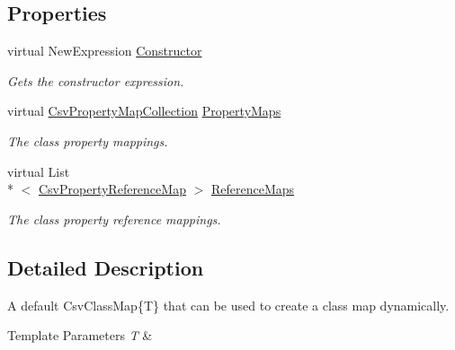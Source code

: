 \subsection*{Properties}
\begin{DoxyCompactItemize}
\item 
virtual New\-Expression \hyperlink{a00040_ae8038b36db7584ef1a73852fcc46404b}{Constructor}
\begin{DoxyCompactList}\small\item\em Gets the constructor expression. \end{DoxyCompactList}\item 
virtual \hyperlink{a00051}{Csv\-Property\-Map\-Collection} \hyperlink{a00040_a9580e897abcba144f3101eb983348e25}{Property\-Maps}
\begin{DoxyCompactList}\small\item\em The class property mappings. \end{DoxyCompactList}\item 
virtual List\\*
$<$ \hyperlink{a00055}{Csv\-Property\-Reference\-Map} $>$ \hyperlink{a00040_a6dfbf8f743b16d2ec83edef865ea2d9e}{Reference\-Maps}
\begin{DoxyCompactList}\small\item\em The class property reference mappings. \end{DoxyCompactList}\end{DoxyCompactItemize}


\subsection{Detailed Description}
A default Csv\-Class\-Map\{\-T\} that can be used to create a class map dynamically. 


\begin{DoxyTemplParams}{Template Parameters}
{\em T} & \\
\hline
\end{DoxyTemplParams}


